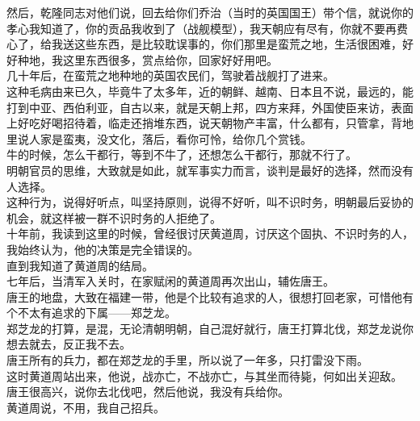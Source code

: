 \begin{multicols}{\theparacolNo}
然后，乾隆同志对他们说，回去给你们乔治（当时的英国国王）带个信，就说你的孝心我知道了，你的贡品我收到了（战舰模型），我天朝应有尽有，你就不要再费心了，给我送这些东西，是比较耽误事的，你们那里是蛮荒之地，生活很困难，好好种地，我这里东西很多，赏点给你，回家好好用吧。\\

几十年后，在蛮荒之地种地的英国农民们，驾驶着战舰打了进来。\\

这种毛病由来已久，毕竟牛了太多年，近的朝鲜、越南、日本且不说，最远的，能打到中亚、西伯利亚，自古以来，就是天朝上邦，四方来拜，外国使臣来访，表面上好吃好喝招待着，临走还捎堆东西，说天朝物产丰富，什么都有，只管拿，背地里说人家是蛮夷，没文化，落后，看你可怜，给你几个赏钱。\\

牛的时候，怎么干都行，等到不牛了，还想怎么干都行，那就不行了。\\

明朝官员的思维，大致就是如此，就军事实力而言，谈判是最好的选择，然而没有人选择。\\

这种行为，说得好听点，叫坚持原则，说得不好听，叫不识时务，明朝最后妥协的机会，就这样被一群不识时务的人拒绝了。\\

十年前，我读到这里的时候，曾经很讨厌黄道周，讨厌这个固执、不识时务的人，我始终认为，他的决策是完全错误的。\\

直到我知道了黄道周的结局。\\

七年后，当清军入关时，在家赋闲的黄道周再次出山，辅佐唐王。\\

唐王的地盘，大致在福建一带，他是个比较有追求的人，很想打回老家，可惜他有个不太有追求的下属——郑芝龙。\\

郑芝龙的打算，是混，无论清朝明朝，自己混好就行，唐王打算北伐，郑芝龙说你想去就去，反正我不去。\\

唐王所有的兵力，都在郑芝龙的手里，所以说了一年多，只打雷没下雨。\\

这时黄道周站出来，他说，战亦亡，不战亦亡，与其坐而待毙，何如出关迎敌。\\

唐王很高兴，说你去北伐吧，然后他说，我没有兵给你。\\

黄道周说，不用，我自己招兵。\\


\end{multicols}
